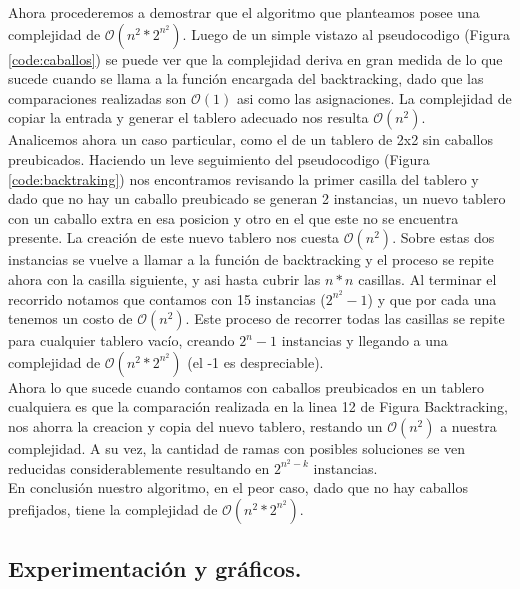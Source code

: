 Ahora procederemos a demostrar que el algoritmo que planteamos posee una complejidad de $\mathcal{O}(n^2*2^{n^2})$. Luego de un simple vistazo al pseudocodigo (Figura \ref{code:caballos}) se puede ver que la complejidad deriva en gran medida de lo que sucede cuando se llama a la función encargada del backtracking, dado que las comparaciones realizadas son $\mathcal{O}(1)$ asi como las asignaciones. La complejidad de copiar la entrada y generar el tablero adecuado nos resulta $\mathcal{O}(n^2)$.\\
Analicemos ahora un caso particular, como el de un tablero de 2x2 sin caballos preubicados. Haciendo un leve seguimiento del pseudocodigo (Figura \ref{code:backtraking}) nos encontramos revisando la primer casilla del tablero y dado que no hay un caballo preubicado se generan 2 instancias, un nuevo tablero con un caballo extra en esa posicion y otro en el que este no se encuentra presente. La creación de este nuevo tablero nos cuesta $\mathcal{O}(n^2)$. Sobre estas dos instancias se vuelve a llamar a la función de backtracking y el proceso se repite ahora con la casilla siguiente, y asi hasta cubrir las $n*n$ casillas. Al terminar el recorrido notamos que contamos con 15 instancias ($2^{n^2} - 1$) y que por cada una tenemos un costo de $\mathcal{O}(n^2)$.
Este proceso de recorrer todas las casillas se repite para cualquier tablero vacío, creando $2^n -1$ instancias y llegando a una complejidad de $\mathcal{O}(n^2*2^{n^2})$ (el -1 es despreciable).\\
Ahora lo que sucede cuando contamos con caballos preubicados en un tablero cualquiera es que la comparación realizada en la linea 12 de Figura Backtracking, nos ahorra la creacion y copia del nuevo tablero, restando un $\mathcal{O}(n^2)$ a nuestra complejidad. A su vez, la cantidad de ramas con posibles soluciones se ven reducidas considerablemente resultando en $2^{n^2-k}$ instancias.\\
En conclusión nuestro algoritmo, en el peor caso, dado que no hay caballos prefijados, tiene la complejidad de $\mathcal{O}(n^2*2^{n^2})$.

\vspace*{0.6cm}

\subsection{Experimentación y gráficos.}

\vspace*{0.3cm}

